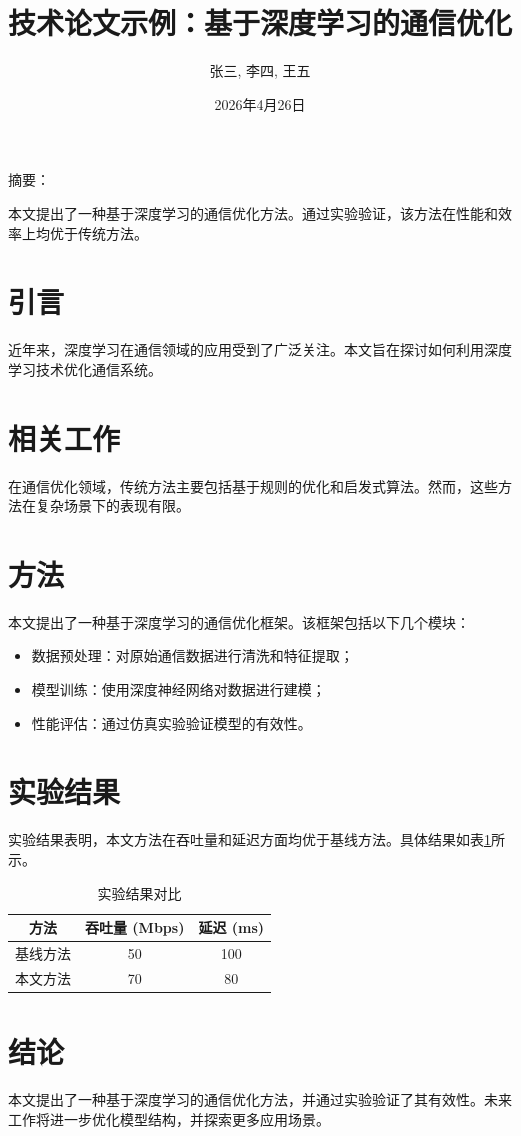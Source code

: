 \documentclass[twocolumn,a4paper,10pt]{ctexart}
\title{技术论文示例：基于深度学习的通信优化}
\author{张三, 李四, 王五}
\date{2026年4月26日}
\renewenvironment{abstract}{
  \begin{center}
  \begin{minipage}{0.9\linewidth}
  \zihao{5}\kaishu
  {\heiti\zihao{5} 摘\quad 要：}
}{
  \end{minipage}
  \end{center}
  \vspace{5pt}
}
\begin{document}
\maketitle

\begin{abstract}
本文提出了一种基于深度学习的通信优化方法。通过实验验证，该方法在性能和效率上均优于传统方法。
\end{abstract}

\section{引言}
近年来，深度学习在通信领域的应用受到了广泛关注。本文旨在探讨如何利用深度学习技术优化通信系统。

\section{相关工作}
在通信优化领域，传统方法主要包括基于规则的优化和启发式算法。然而，这些方法在复杂场景下的表现有限。

\section{方法}
本文提出了一种基于深度学习的通信优化框架。该框架包括以下几个模块：
\begin{itemize}
    \item 数据预处理：对原始通信数据进行清洗和特征提取；
    \item 模型训练：使用深度神经网络对数据进行建模；
    \item 性能评估：通过仿真实验验证模型的有效性。
\end{itemize}

\section{实验结果}
实验结果表明，本文方法在吞吐量和延迟方面均优于基线方法。具体结果如表\ref{tab:results}所示。

\begin{table}[ht]
    \centering
    \caption{实验结果对比}
    \label{tab:results}
    \begin{tabular}{|c|c|c|}
        \hline
        方法 & 吞吐量 (Mbps) & 延迟 (ms) \\
        \hline
        基线方法 & 50 & 100 \\
        \hline
        本文方法 & 70 & 80 \\
        \hline
    \end{tabular}
\end{table}

\section{结论}
本文提出了一种基于深度学习的通信优化方法，并通过实验验证了其有效性。未来工作将进一步优化模型结构，并探索更多应用场景。



\end{document}
